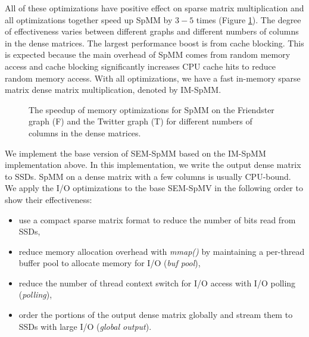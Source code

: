 All of these optimizations have positive effect on sparse matrix
multiplication and all optimizations together speed up SpMM by $3-5$ times
(Figure \ref{perf:spmm_opt}). The degree of effectiveness
varies between different graphs and different numbers of columns in
the dense matrices. The largest performance boost is from cache blocking.
This is expected because the main overhead of SpMM comes from random memory
access and cache blocking significantly increases CPU cache hits to reduce
random memory access.
With all optimizations, we have a fast
in-memory sparse matrix dense matrix multiplication, denoted by IM-SpMM.

\begin{figure}
	\begin{center}
		\footnotesize
		
		\caption{The speedup of memory optimizations for SpMM on the Friendster
			graph (F) and the Twitter graph (T) for different numbers of
			columns in the dense matrices.}
		\label{perf:spmm_opt}
	\end{center}
\end{figure}

We implement the base version of SEM-SpMM based on the IM-SpMM implementation
above. In this implementation, we write the output dense matrix to SSDs.
SpMM on a dense matrix with a few columns is usually CPU-bound.
We apply the I/O optimizations to the base SEM-SpMV in the following order to show
their effectiveness:
\begin{itemize} \itemsep1pt \parskip0pt 
	\item use a compact sparse matrix format to reduce the number of bits read
		from SSDs,
	\item reduce memory allocation overhead with \textit{mmap()} by maintaining
		a per-thread buffer pool to allocate memory for I/O (\textit{buf pool}),
	\item reduce the number of thread context switch for I/O access with I/O
		polling (\textit{polling}),
	\item order the portions of the output dense matrix globally and stream them
		to SSDs with large I/O (\textit{global output}).
\end{itemize}

